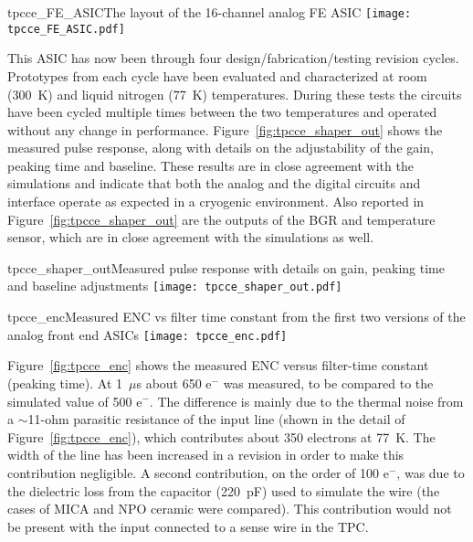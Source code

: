 \begin{cdrfigure}{tpcce_FE_ASIC}{The layout of the 16-channel analog FE ASIC}
\texttt{[image: tpcce\_FE\_ASIC.pdf]} %
\end{cdrfigure}

This ASIC has now been through four design/fabrication/testing revision cycles.
Prototypes from each cycle have been evaluated and characterized at room (300~K) and liquid nitrogen (77~K) temperatures.
During these tests the circuits have been cycled multiple times
between the two temperatures and operated without any change in performance.
Figure~\ref{fig:tpcce_shaper_out} shows the measured pulse response, along with
details on the adjustability of the gain, peaking time and baseline.
These results are in close agreement with the simulations and indicate
that both the analog and the digital circuits and interface operate as
expected in a cryogenic environment.
Also reported in Figure~\ref{fig:tpcce_shaper_out} are the outputs of the BGR and temperature sensor,
which are in close agreement with the simulations as well.

\begin{cdrfigure}{tpcce_shaper_out}{Measured pulse response with details on gain, peaking time and baseline adjustments}
\texttt{[image: tpcce\_shaper\_out.pdf]}
\end{cdrfigure}

\begin{cdrfigure}{tpcce_enc}{Measured ENC vs filter time constant from the first two versions of the analog front end ASICs}
\texttt{[image: tpcce\_enc.pdf]}
\end{cdrfigure}

Figure~\ref{fig:tpcce_enc} shows the measured ENC versus filter-time constant (peaking time).
At 1~$\mu$s about 650 e$^{-}$ was measured, to be compared to the simulated value of 500 e$^{-}$.
The difference is mainly due to the thermal noise from a $\sim$11-ohm parasitic resistance of the input
line (shown in the detail of Figure~\ref{fig:tpcce_enc}), which contributes about 350 electrons at 77~K.
The width of the line has been increased in a revision in order to make this contribution negligible.
A second contribution, on the order of 100 e$^{-}$,
was due to the dielectric loss from the capacitor (220~pF) used to simulate the wire
(the cases of MICA and NPO ceramic were compared).
This contribution would not be present with the input connected to a sense wire in the TPC.

